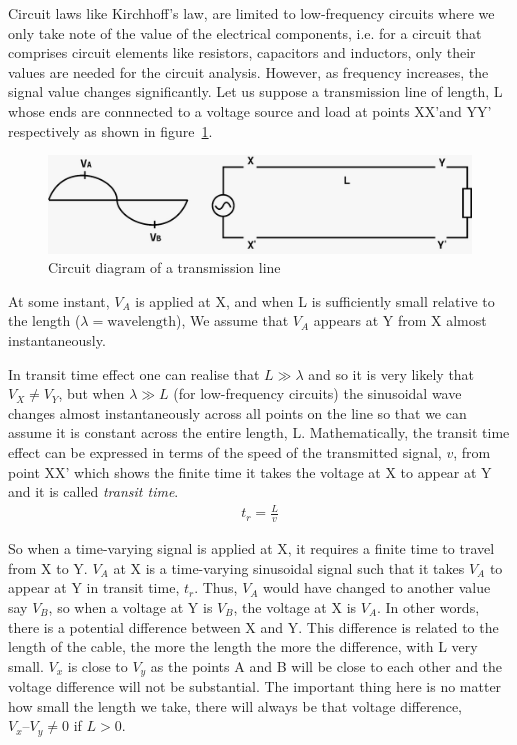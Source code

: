 Circuit laws like Kirchhoff’s law, are limited to low-frequency circuits where we only take note of the value of the electrical components, i.e. for a circuit that comprises circuit elements like resistors, capacitors and inductors, only their values are needed for the circuit analysis. However, as frequency increases, the signal value changes significantly. Let us suppose a transmission line of length, L whose ends are connnected to a voltage source and load at points XX'and YY' respectively as shown in figure~\ref{fig:first}.
\begin{figure}[h]
\centering
\includegraphics[width=1\linewidth]{graphics/fig2.7}
\caption{Circuit diagram of a transmission line}
\label{fig:first}
\end{figure}

At some instant, $ V_{A} $ is applied at X, and when L is sufficiently small relative to the length ($  \lambda = \text{wavelength} $), We assume that $ V_{A} $ appears at Y from X almost instantaneously.

In transit time effect one can realise that $ L \gg\lambda$ and so it is very likely that $ V_{X} \neq V_{Y} $, but when $  \lambda \gg L  $ (for low-frequency circuits) the sinusoidal wave changes almost instantaneously across all points on the line so that we can assume it is constant across the entire length, L. Mathematically, the transit time effect can be expressed in terms of the speed of the transmitted signal, $v$, from point XX' which shows the finite time it takes the voltage at X to appear at Y and it is called \textit{transit time}.
\begin{align}
t_{r} = \frac{L}{v}
\label{eqn:transittime}
\end{align}

So when a time-varying signal is applied at X, it requires a finite time to travel from X to Y. $ V_{A} $ at X is a time-varying sinusoidal signal such that it takes $ V_{A} $ to appear at Y in transit time, $t_r$. Thus, $ V_{A} $ would have changed to another value say $ V_{B} $, so when a voltage at Y is $ V_{B} $, the voltage at X is $ V_{A} $. In other words, there is a potential difference between X and Y. This difference is related to the length of the cable, the more the length the more the difference, with L very small. $ V_{x} $ is close to $ V_{y} $ as the points A and B will be close to each other and the voltage difference will not be substantial. The important thing here is no matter how small the length we take, there will always be that voltage difference, $ V_{x} – V_{y} \neq 0 $ if $ L > 0 $.


